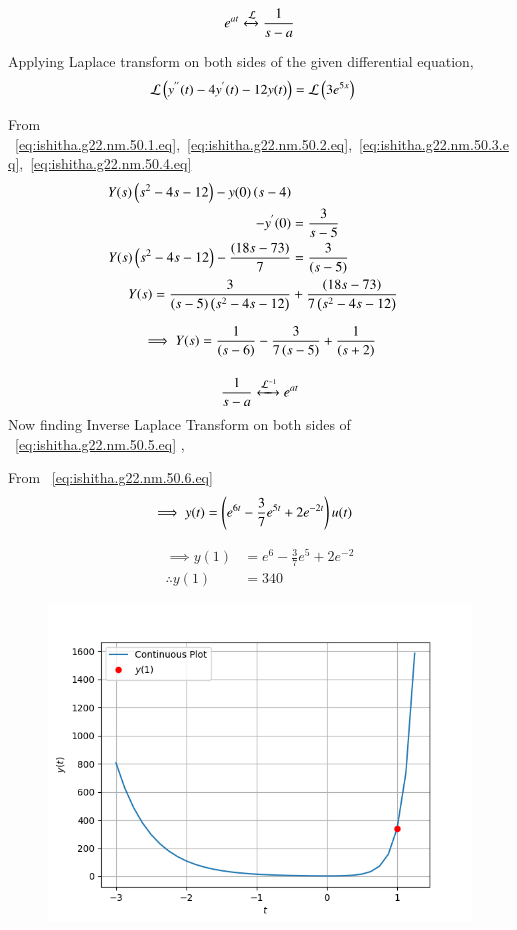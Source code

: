 \documentclass[journal,12pt,twocolumn]{IEEEtran}
\theoremstyle{remark}
\begin{document}
\begin{equation}
e^{at}   \stackrel{}{\xleftrightarrow{\mathcal{L}}}  \frac{1}{s-a} \\ \label{eq:ishitha.g22.nm.50.4.eq}
\end{equation}

Applying Laplace transform on both sides of the given differential equation,
\begin{align}
\mathcal{L}\left(y^{''}(t) - 4y^{'}(t) -12y(t)\right)&=\mathcal{L}\left(3e^{5x}\right)
\end{align}

From ~\eqref{eq:ishitha.g22.nm.50.1.eq},~\eqref{eq:ishitha.g22.nm.50.2.eq},~\eqref{eq:ishitha.g22.nm.50.3.eq},~\eqref{eq:ishitha.g22.nm.50.4.eq}
\begin{align}
Y(s)\left(s^{2}-4s-12\right) -y(0)\left(s-4\right) \nonumber \\-y^{'}(0) &= \frac{3}{s-5} \\
Y(s)\left(s^{2}-4s-12\right) - \frac{\left(18s -73 \right)}{7}  &=\frac{3}{(s-5)} \\
Y(s) = \frac{3}{(s-5)\left(s^{2}-4s-12\right)} &+ \frac{\left(18s -73 \right)}{7\left(s^{2}-4s-12\right) } 
\end{align}

\begin{equation}
\implies Y(s) = \frac{1}{\left(s-6\right)} -\frac{3}{7\left(s-5\right)} + \frac{1}{\left(s+2\right)} \\ \label{eq:ishitha.g22.nm.50.5.eq}
\end{equation}


\begin{equation}
\frac{1}{s-a}   \stackrel{}{\xleftrightarrow{\mathcal{L}^{-1}}}  e^{at}  \\ \label{eq:ishitha.g22.nm.50.6.eq}
\end{equation}
Now finding Inverse Laplace Transform on both sides of ~\eqref{eq:ishitha.g22.nm.50.5.eq} ,

From ~\eqref{eq:ishitha.g22.nm.50.6.eq}
\begin{align}
\implies y(t) &= \left(e^{6t} -\frac{3}{7}e^{5t} + 2e^{-2t}\right)u(t)
\end{align}

\begin{align}
\implies y(1) &= e^{6} -\frac{3}{7}e^{5} + 2e^{-2} \\
\therefore y(1) &= 340
\end{align}

\begin{figure}[!ht]
    \centering
     \includegraphics[width=\columnwidth]{./figs/g50fig1.png}
    \caption{}    
    \label{fig:ishitha.g22.nm.50.f2}
\end{figure}
\end{document}
